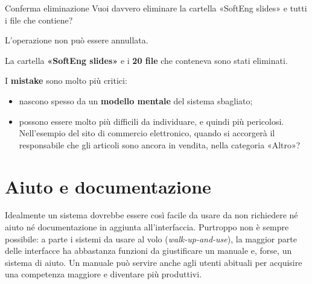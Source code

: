 \begin{center}
\begin{minipage}[t]{0.42\linewidth}\centering
  \begin{finestra}{Conferma eliminazione}
    Vuoi davvero eliminare la cartella «SoftEng slides» e tutti i file che contiene?\par\smallskip
    L'operazione non può essere annullata.
  \end{finestra}\par\smallskip\male
\end{minipage}\hspace{0.06\linewidth}%
\begin{minipage}[t]{0.42\linewidth}\centering
  \begin{tcolorbox}[enhanced, nobeforeafter, box align=top, width=\linewidth, colback=swred!85!black, colframe=swred!85!black,
    arc=3pt, left=6pt, right=6pt, top=5pt, bottom=5pt, fontupper=\scriptsize\Lato\color{white}]
    La cartella \textbf{«SoftEng slides»} e i \textbf{20 file} che conteneva sono stati eliminati.
    \par{}
  \end{tcolorbox}\par\smallskip\bene
\end{minipage}
\end{center}

I \textbf{mistake} sono molto più critici:

\begin{itemize}
  \item nascono spesso da un \textbf{modello mentale} del sistema sbagliato;
  \item possono essere molto più difficili da individuare, e quindi più pericolosi. Nell'esempio del sito di commercio
        elettronico, quando si accorgerà il responsabile che gli articoli sono ancora in vendita, nella categoria
        «Altro»?
\end{itemize}

\section{Aiuto e documentazione}

Idealmente un sistema dovrebbe essere così facile da usare da non richiedere né aiuto né documentazione in aggiunta
all'interfaccia. Purtroppo non è sempre possibile: a parte i sistemi da usare al volo (\textit{walk-up-and-use}), la
maggior parte delle interfacce ha abbastanza funzioni da giustificare un manuale e, forse, un sistema di aiuto. Un
manuale può servire anche agli utenti abituali per acquisire una competenza maggiore e diventare più produttivi.

